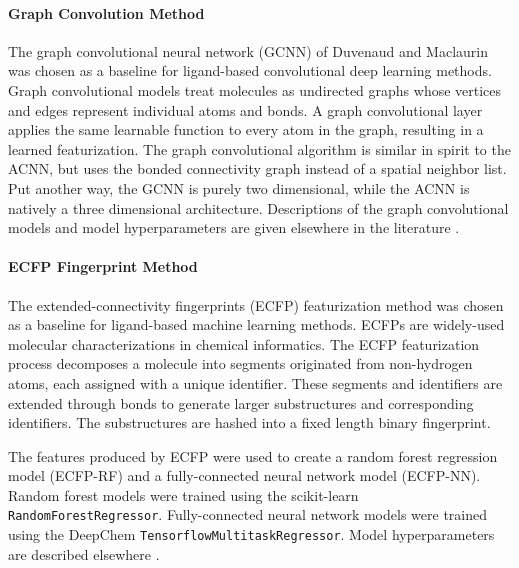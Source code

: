 \paragraph{Graph Convolution Method}

The graph convolutional neural network (GCNN) of Duvenaud and Maclaurin\cite{duvenaud2015convolutional} was chosen as a baseline for ligand-based convolutional deep learning methods.  Graph convolutional models treat molecules as undirected graphs whose vertices and edges represent individual atoms and bonds. A graph convolutional layer applies the same learnable function to every atom in the graph, resulting in a learned featurization. The graph convolutional algorithm is similar in spirit to the ACNN, but uses the bonded connectivity graph instead of a spatial neighbor list. Put another way, the GCNN is purely two dimensional, while the ACNN is natively a three dimensional architecture. Descriptions of the graph convolutional models and model hyperparameters are given elsewhere in the literature \cite{wu2017moleculenet}.

\paragraph{ECFP Fingerprint Method}

The extended-connectivity fingerprints\cite{rogers2010extended} (ECFP) featurization method was chosen as a baseline for ligand-based machine learning methods.  ECFPs are widely-used molecular characterizations in chemical informatics. The ECFP featurization process decomposes a  molecule into segments originated from non-hydrogen atoms, each assigned with a unique identifier. These segments and identifiers are extended through bonds to generate larger substructures and corresponding identifiers. The substructures are hashed into a fixed length binary fingerprint.

The features produced by ECFP were used to create a random forest regression model (ECFP-RF) and a fully-connected neural network model (ECFP-NN). Random forest models were trained using the scikit-learn \texttt{RandomForestRegressor}.  Fully-connected neural network models were trained using the DeepChem \texttt{TensorflowMultitaskRegressor}. Model hyperparameters are described elsewhere \cite{wu2017moleculenet}.

